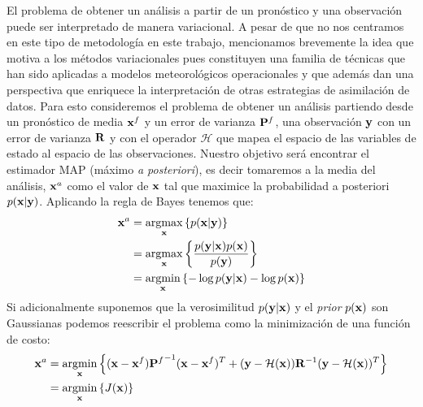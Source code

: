 El problema de obtener un análisis a partir de un pronóstico y una observación puede ser interpretado de manera variacional. A pesar de que no nos centramos en este tipo de metodología en este trabajo, mencionamos brevemente la idea que motiva a los métodos variacionales pues constituyen una familia de técnicas que han sido aplicadas a modelos meteorológicos operacionales y que además dan una perspectiva que enriquece la interpretación de otras estrategias de asimilación de datos. Para esto consideremos el problema de obtener un análisis partiendo desde un pronóstico de media $\mathbf{x}^f$ y un error de varianza $\mathbf{P}^f$, una observación $\mathbf{y}$ con un error de varianza $\mathbf{R}$ y con el operador $\mathcal{H}$ que mapea el espacio de las variables de estado al espacio de las observaciones. Nuestro objetivo será encontrar el estimador MAP (máximo \textit{a posteriori}), es decir tomaremos a la media del análisis, $\mathbf{x}^a$ como el valor de $\mathbf{x}$ tal que maximice la probabilidad a posteriori $p(\mathbf{x} | \mathbf{y})$. Aplicando la regla de Bayes tenemos que:
\begin{align*}
    \mathbf{x}^a &= \operatorname*{argmax}\limits_{\mathbf{x}} \left\lbrace p(\mathbf{x} | \mathbf{y}) \right\rbrace \\
    &= \operatorname*{argmax}\limits_{\mathbf{x}} \left\lbrace \frac{p(\mathbf{y} | \mathbf{x}) p(\mathbf{x})}{p(\mathbf{y})} \right\rbrace \\
    &= \operatorname*{argmin}\limits_{\mathbf{x}} \left\lbrace - \log p(\mathbf{y} | \mathbf{x}) - \log p(\mathbf{x}) \right\rbrace
\end{align*}
Si adicionalmente suponemos que la verosimilitud $p(\mathbf{y} | \mathbf{x})$ y el \textit{prior} $ p(\mathbf{x})$ son Gaussianas podemos reescribir el problema como la minimización de una función de costo:
\begin{align} \label{eq:3dvar_cost}
    \mathbf{x}^a &= \operatorname*{argmin}\limits_{\mathbf{x}} \left\lbrace (\mathbf{x} - \mathbf{x}^f) {\mathbf{P}^f}^{-1} (\mathbf{x} - \mathbf{x}^f)^T + (\mathbf{y} - \mathcal{H} (\mathbf{x})) \mathbf{R}^{-1} (\mathbf{y} - \mathcal{H} (\mathbf{x}))^T \right\rbrace \\
    &= \operatorname*{argmin}\limits_{\mathbf{x}} \left\lbrace J(\mathbf{x}) \right\rbrace
\end{align}

